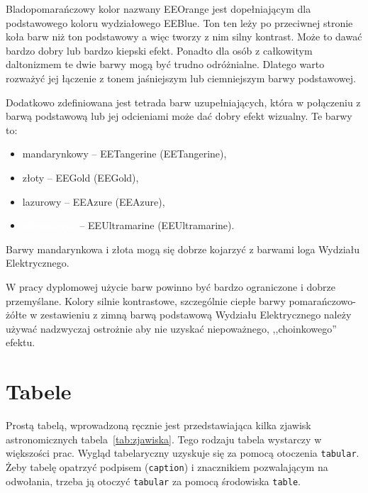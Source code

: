 Bladopomarańczowy kolor nazwany \textcolor{EEOrange}{EEOrange} jest dopełniającym dla podstawowego koloru wydziałowego EEBlue. Ton ten leży po przeciwnej stronie koła barw niż ton podstawowy a więc tworzy z nim silny kontrast. Może to dawać bardzo dobry lub bardzo kiepski efekt. Ponadto dla osób z całkowitym daltonizmem te dwie barwy mogą być trudno odróżnialne. Dlatego warto rozważyć jej łączenie z tonem jaśniejszym lub ciemniejszym barwy podstawowej.

Dodatkowo zdefiniowana jest tetrada barw uzupełniających, która w połączeniu z barwą podstawową lub jej odcieniami może dać dobry efekt wizualny. Te barwy to:
\begin{itemize}
    \item \colorbox{EETangerine}{mandarynkowy} -- \textcolor{EETangerine}{EETangerine} (EETangerine),
    \item \colorbox{EEGold}{złoty} --  \textcolor{EEGold}{EEGold} (EEGold),
    \item \colorbox{EEAzure}{lazurowy} --  \textcolor{EEAzure}{EEAzure} (EEAzure),
    \item \colorbox{EEUltramarine}{\textcolor{white}{ultramaryna}} --  \textcolor{EEUltramarine}{EEUltramarine} (EEUltramarine).
\end{itemize}
Barwy mandarynkowa i złota mogą się dobrze kojarzyć z barwami loga Wydziału Elektrycznego.

W pracy dyplomowej użycie barw powinno być bardzo ograniczone i dobrze przemyślane. Kolory silnie kontrastowe, szczególnie ciepłe barwy pomarańczowo-żółte w zestawieniu z zimną barwą podstawową Wydziału Elektrycznego należy używać nadzwyczaj ostrożnie aby nie uzyskać niepoważnego, ,,choinkowego'' efektu.

\section{Tabele}
Prostą tabelą, wprowadzoną ręcznie jest przedstawiająca kilka zjawisk astronomicznych tabela~\ref{tab:zjawiska}. Tego rodzaju tabela wystarczy w większości prac. Wygląd tabelaryczny uzyskuje się za pomocą otoczenia \texttt{tabular}. Żeby tabelę opatrzyć podpisem (\texttt{caption}) i znacznikiem pozwalającym na odwołania, trzeba ją otoczyć \texttt{tabular} za pomocą środowiska \texttt{table}.

